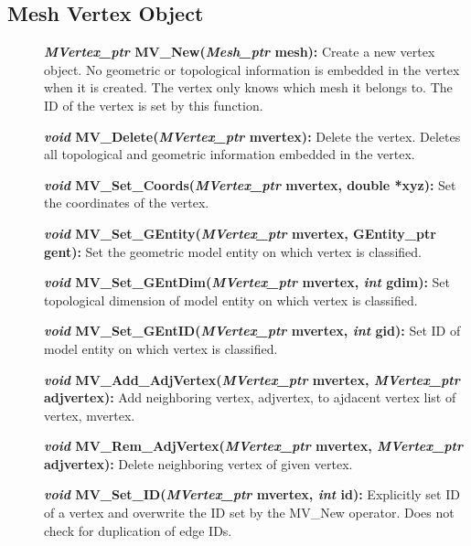 \documentclass[12pt]{article}
\begin{document}
\newpage
\subsection{Mesh Vertex Object}

\begin{description}
\item[]\textbf{\textit{MVertex\_ptr} MV\_New(\textit{Mesh\_ptr} mesh):}
Create a new vertex object. No geometric or topological information is
embedded in the vertex when it is created. The vertex only knows which
mesh it belongs to. The ID of the vertex is set by this function.

\item[]\textbf{\textit{void} MV\_Delete(\textit{MVertex\_ptr} mvertex):}
Delete the vertex. Deletes all topological and geometric
information embedded in the vertex.

\item[]\textbf{\textit{void} MV\_Set\_Coords(\textit{MVertex\_ptr} mvertex,
double *xyz):} Set the coordinates of the vertex.

\item[]\textbf{\textit{void} MV\_Set\_GEntity(\textit{MVertex\_ptr} mvertex,
GEntity\_ptr gent):} Set the geometric model entity on which vertex is
classified.


\item[]\textbf{\textit{void} MV\_Set\_GEntDim(\textit{MVertex\_ptr} mvertex,
\textit{int} gdim):} Set topological dimension of model entity on which
vertex is classified.

\item[]\textbf{\textit{void} MV\_Set\_GEntID(\textit{MVertex\_ptr} mvertex,
\textit{int} gid):} Set ID of model entity on which vertex is
classified.

\item[]\textbf{\textit{void} MV\_Add\_AdjVertex(\textit{MVertex\_ptr}
mvertex, \textit{MVertex\_ptr} adjvertex):} Add neighboring vertex,
adjvertex, to ajdacent vertex list of vertex, mvertex.

\item[]\textbf{\textit{void} MV\_Rem\_AdjVertex(\textit{MVertex\_ptr}
mvertex, \textit{MVertex\_ptr} adjvertex):} Delete neighboring vertex
of given vertex.

\item[]\textbf{\textit{void} MV\_Set\_ID(\textit{MVertex\_ptr} mvertex,
\textit{int} id):} Explicitly set ID of a vertex and overwrite the ID
set by the MV\_New operator. Does not check for duplication of edge
IDs.


\end{description}
\end{document}

